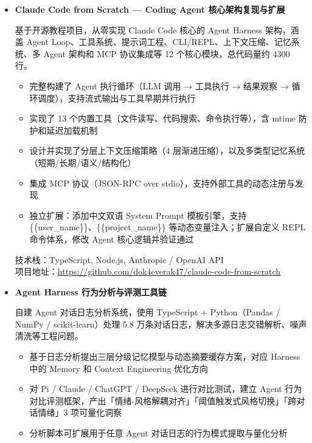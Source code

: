 \documentclass[zh]{resume}
\begin{document}
\begin{itemize}
    \item \textbf{Claude Code from Scratch — Coding Agent 核心架构复现与扩展}

    基于开源教程项目，从零实现 Claude Code 核心的 Agent Harness 架构，涵盖 Agent Loop、工具系统、提示词工程、CLI/REPL、上下文压缩、记忆系统、多 Agent 架构和 MCP 协议集成等 12 个核心模块，总代码量约 4300 行。

    \begin{itemize}
        \item 完整构建了 Agent 执行循环（LLM 调用 → 工具执行 → 结果观察 → 循环调度），支持流式输出与工具早期并行执行
        \item 实现了 13 个内置工具（文件读写、代码搜索、命令执行等），含 mtime 防护和延迟加载机制
        \item 设计并实现了分层上下文压缩策略（4 层渐进压缩），以及多类型记忆系统（短期/长期/语义/结构化）
        \item 集成 MCP 协议（JSON-RPC over stdio），支持外部工具的动态注册与发现
        \item 独立扩展：添加中文双语 System Prompt 模板引擎，支持 \{\{user\_name\}\}、\{\{project\_name\}\} 等动态变量注入；扩展自定义 REPL 命令体系，修改 Agent 核心逻辑并验证通过
    \end{itemize}

    技术栈：TypeScript, Node.js, Anthropic / OpenAI API \\
    项目地址：\url{https://github.com/dok4everak47/claude-code-from-scratch}


    \item \textbf{Agent Harness 行为分析与评测工具链}

    自建 Agent 对话日志分析系统，使用 TypeScript + Python（Pandas / NumPy / scikit-learn）处理 5.8 万条对话日志，解决多源日志交错解析、噪声清洗等工程问题。

    \begin{itemize}
        \item 基于日志分析提出三层分级记忆模型与动态摘要缓存方案，对应 Harness 中的 Memory 和 Context Engineering 优化方向
        \item 对 Pi / Claude / ChatGPT / DeepSeek 进行对比测试，建立 Agent 行为对比评测框架，产出「情绪-风格解耦对齐」「阈值触发式风格切换」「跨对话情绪」3 项可量化洞察
        \item 分析脚本可扩展用于任意 Agent 对话日志的行为模式提取与量化分析
    \end{itemize}


\end{itemize}
\end{document}
